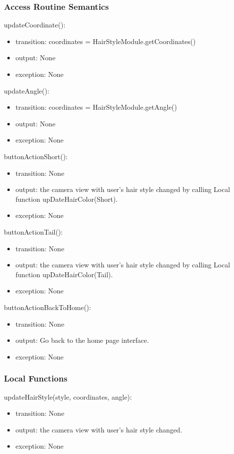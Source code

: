 \documentclass[12pt, titlepage]{article}
\begin{document}
\subsubsection{Access Routine Semantics}

\noindent updateCoordinate():
\begin{itemize}
\item transition: coordinates = HairStyleModule.getCoordinates()  
\item output: None
\item exception: None
\end{itemize}

\noindent updateAngle():
\begin{itemize}
\item transition: coordinates = HairStyleModule.getAngle()  
\item output: None
\item exception: None
\end{itemize}

\noindent buttonActionShort():
\begin{itemize}
\item transition: None 
\item output: the camera view with user's hair style changed by calling Local function upDateHairColor(Short).
\item exception: None
\end{itemize}

\noindent buttonActionTail():
\begin{itemize}
\item transition: None 
\item output: the camera view with user's hair style changed by calling Local function upDateHairColor(Tail).
\item exception: None
\end{itemize}

\noindent buttonActionBackToHome():
\begin{itemize}
\item transition: None 
\item output: Go back to the home page interface.
\item exception: None
\end{itemize}

\subsubsection{Local Functions}
\noindent updateHairStyle(style, coordinates, angle):
\begin{itemize}
\item transition: None 
\item output: the camera view with user's hair style changed.
\item exception: None
\end{itemize}
  
\end{document}
